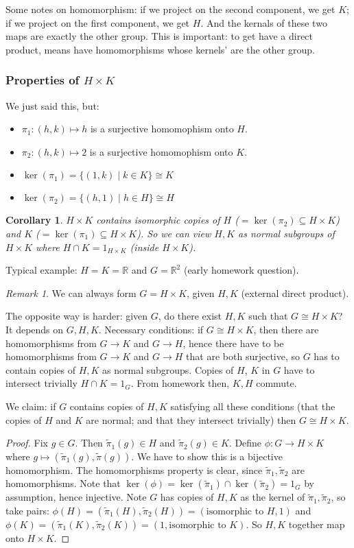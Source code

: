 \documentclass{article}
\theoremstyle{plain}
\newtheorem{corollary}{Corollary}
\theoremstyle{remark}
\newtheorem{remark}{Remark}
\newcommand{\R}{{\mathbb R}}
\begin{document}
Some notes on homomorphism:
if we project on the second component, we get $K$;
if we project on the first component, we get $H$.
And the kernals of these two maps are exactly the other group.
This is important: to get have a direct product,
means have homomorphisms whose kernels' are the other group.

\subsubsection{Properties of $H \times K$}
We just said this, but:
\begin{itemize}
	\item $\pi_1 \colon (h,k) \mapsto h$ is a surjective homomophism onto $H$.
	\item $\pi_2 \colon (h,k) \mapsto 2$ is a surjective homomophism onto $K$.
	\item $\ker(\pi_1) = \{(1,k) \mid k \in K\} \cong K$
	\item $\ker(\pi_2) = \{(h,1) \mid h \in H\} \cong H$
\end{itemize}
\begin{corollary}
	$H \times K$ contains isomorphic copies of $H$ ($= \ker(\pi_2) \subseteq H \times K$)
	and $K$ ($= \ker(\pi_1) \subseteq H \times K$).
	So we can view $H,K$ as \emph{normal} subgroups of $H \times K$
	where $H \cap K = 1_{H \times K}$ (inside $H \times K$).
\end{corollary}
Typical example: $H = K = \R$ and $G = \R^2$ (early homework question).

\begin{remark}
	We can always form $G = H \times K$, given $H,K$ (external direct product).
\end{remark}
The opposite way is harder:
given $G$, do there exist $H,K$ such that $G \cong H \times K$?
It depends on $G,H,K$.
Necessary conditions: if $G \cong H \times K$,
then there are homomorphisms from $G \to K$ and $G \to H$,
hence there have to be homomorphisms from $G \to K$ and $G \to H$ that are both surjective,
so $G$ has to contain copies of $H,K$ as normal subgroups.
Copies of $H$, $K$ in $G$ have to intersect trivially $H \cap K = 1_G$.
From homework then, $K,H$ commute.

We claim: if $G$ contains copies of $H,K$ satisfying all these conditions
(that the copies of $H$ and $K$ are normal; and that they intersect trivially)
then $G \cong H \times K$.
\begin{proof}
	Fix $g \in G$.
	Then $\tilde{\pi}_1(g) \in H$ and $\tilde{\pi}_2(g) \in K$.
	Define $\phi \colon G \to H \times K$ where $g \mapsto
	(\tilde{\pi}_1(g),\tilde{\pi}(g))$.
	We have to show this is a bijective homomorphism.
	The homomorphisms property is clear, since
	$\tilde{\pi}_1,\tilde{\pi}_2$ are homomorphisms.
	Note that $\ker(\phi) = \ker(\tilde{\pi}_1) \cap \ker(\tilde{\pi}_2) = 1_G$
	by assumption, hence injective.
	Note $G$ has copies of $H,K$ as the kernel of $\tilde{\pi}_1,\tilde{\pi}_2$,
	so take pairs:
	$\phi(H) = (\tilde{\pi}_1(H),\tilde{\pi}_2(H)) = (\text{isomorphic to }H,1)$
	and $\phi(K) = (\tilde{\pi}_1(K),\tilde{\pi}_2(K)) = (1,\text{isomorphic to }K)$.
	So $H,K$ together map onto $H \times K$.
\end{proof}
\end{document}
